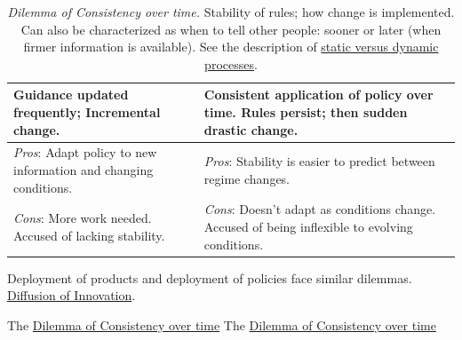 \begin{center}
\begin{table}[H] %
\begin{tabular}{ | m{\dilemmatablewidth}| m{\dilemmatablewidth} | } 
  \hline
  \textbf{Guidance updated frequently; Incremental change.} & 
  \textbf{Consistent application of policy over time. Rules persist; then sudden drastic change.} \\ 
  \hline
  \textit{Pros}: Adapt policy to new information and changing conditions. &
  \textit{Pros}: Stability is easier to predict between regime changes.  \\
  \hline
  \textit{Cons}: More work needed. Accused of lacking stability. & 
  \textit{Cons}: Doesn't adapt as conditions change. Accused of being inflexible to evolving conditions. \\
  \hline
\end{tabular}
\caption{
\textit{Dilemma of Consistency over time.} 
Stability of rules; how change is implemented. Can also be characterized as when to tell other people: sooner or later (when firmer information is available).
See the description of 
\hyperref[sec:static-dynamic-processes]{static versus dynamic processes}.
}
\label{table:consistency}
\end{table}
\end{center}

Deployment of products and deployment of policies face similar dilemmas. \href{https://en.wikipedia.org/wiki/Diffusion_of_innovations}{Diffusion of Innovation}.

The \href{table:consistency}{Dilemma of Consistency over time}
The \href{table:consistency}{Dilemma of Consistency over time}


